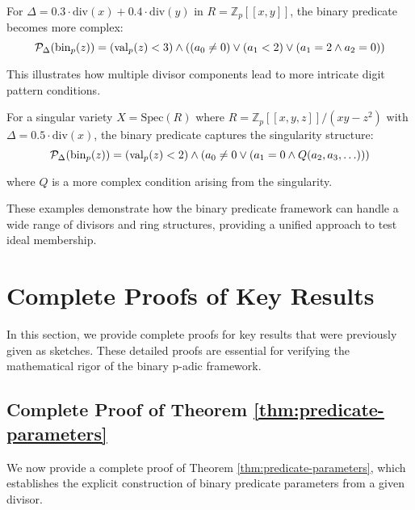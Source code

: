 \begin{example}\label{ex:multiple-components}
For $\Delta = 0.3 \cdot \text{div}(x) + 0.4 \cdot \text{div}(y)$ in $R = \mathbb{Z}_p[[x,y]]$, the binary predicate becomes more complex:
$$\mathcal{P}_\Delta(\operatorname{bin}_p(z)) = (\operatorname{val}_p(z) < 3) \wedge ((a_0 \neq 0) \vee (a_1 < 2) \vee (a_1 = 2 \wedge a_2 = 0))$$

This illustrates how multiple divisor components lead to more intricate digit pattern conditions.
\end{example}

\begin{example}\label{ex:singular-point}
For a singular variety $X = \text{Spec}(R)$ where $R = \mathbb{Z}_p[[x,y,z]]/(xy-z^2)$ with $\Delta = 0.5 \cdot \text{div}(x)$, the binary predicate captures the singularity structure:
$$\mathcal{P}_\Delta(\operatorname{bin}_p(z)) = (\operatorname{val}_p(z) < 2) \wedge (a_0 \neq 0 \vee (a_1 = 0 \wedge Q(a_2, a_3, \ldots)))$$

where $Q$ is a more complex condition arising from the singularity.
\end{example}

These examples demonstrate how the binary predicate framework can handle a wide range of divisors and ring structures, providing a unified approach to test ideal membership. 

\section{Complete Proofs of Key Results}\label{sec:complete-proofs}

In this section, we provide complete proofs for key results that were previously given as sketches. These detailed proofs are essential for verifying the mathematical rigor of the binary p-adic framework.

\subsection{Complete Proof of Theorem \ref{thm:predicate-parameters}}

We now provide a complete proof of Theorem \ref{thm:predicate-parameters}, which establishes the explicit construction of binary predicate parameters from a given divisor.


